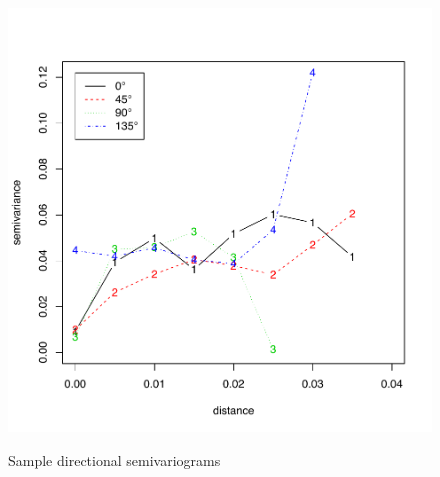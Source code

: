 \documentclass[12pt]{article}
\begin{document}
	\begin{figure}[H]
		\centering
		\includegraphics[scale=0.7]{Pictures/variogram_angle.pdf}\\
		\caption{Sample directional semivariograms}\label{isotropy_plot}
	\end{figure}
\end{document}
